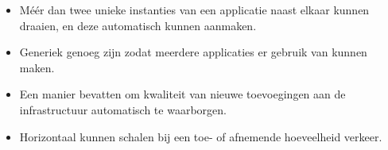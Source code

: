 \begin{itemize}
	\item Méér dan twee unieke instanties van een applicatie naast elkaar kunnen draaien, en deze automatisch kunnen aanmaken.
	\item Generiek genoeg zijn zodat meerdere applicaties er gebruik van kunnen maken.
	\item Een manier bevatten om kwaliteit van nieuwe toevoegingen aan de infrastructuur automatisch te waarborgen.
	\item Horizontaal kunnen schalen bij een toe- of afnemende hoeveelheid verkeer.
\end{itemize}
